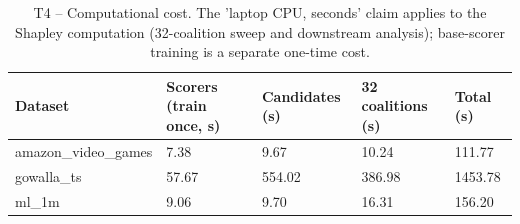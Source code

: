 \begin{table}[htbp]
\centering
\footnotesize
\caption{T4 -- Computational cost. The 'laptop CPU, seconds' claim applies to the Shapley computation (32-coalition sweep and downstream analysis); base-scorer training is a separate one-time cost.}
\label{tab:T4_cost}
\begin{tabular}{lllll}
\toprule
Dataset & Scorers (train once, s) & Candidates (s) & 32 coalitions (s) & Total (s) \\
\midrule
amazon\_video\_games & 7.38 & 9.67 & 10.24 & 111.77 \\
gowalla\_ts & 57.67 & 554.02 & 386.98 & 1453.78 \\
ml\_1m & 9.06 & 9.70 & 16.31 & 156.20 \\
\bottomrule
\end{tabular}
\end{table}
